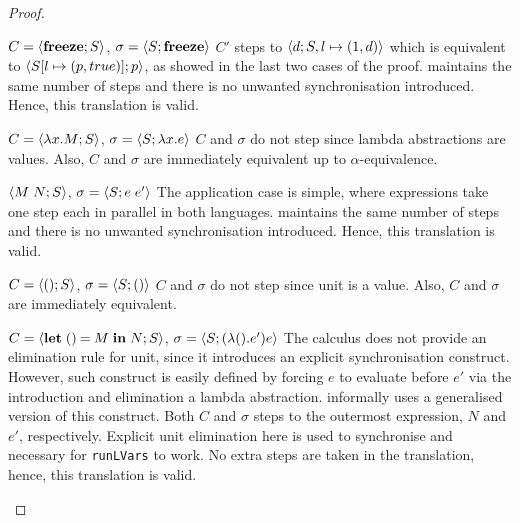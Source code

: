 \documentclass[main.tex]{subfiles}
\begin{document}
\begin{proof}
  \begin{case}{%
      $C = \langle {\ensuremath{\mathbf{freeze}}}; {S} \rangle$,
      $\sigma = \langle {S}; {\mathbf{freeze}} \rangle$}
    $C'$ steps to $\langle {d}; {S, l \mapsto (1, d)} \rangle$ which is equivalent to $\langle {S[l \mapsto (p, true)]}; {p} \rangle$, as showed in the last two cases of the proof. \typedlambdalvar maintains the same number of steps and there is no unwanted synchronisation introduced. Hence, this translation is valid.
  \end{case}

  \begin{case}{%
      $C = \langle {\lambda x.M}; {S} \rangle$,
      $\sigma = \langle {S}; {\lambda x.e} \rangle$}
    $C$ and $\sigma$ do not step since lambda abstractions are values. Also, $C$ and $\sigma$ are immediately equivalent up to $\alpha$-equivalence.
  \end{case}

  \begin{case}{%
      $\langle {M\;N}; {S} \rangle$,
      $ \sigma = \langle {S}; {e\;e'} \rangle$}
    The application case is simple, where expressions take one step each in parallel in both languages. \typedlambdalvar maintains the same number of steps and there is no unwanted synchronisation introduced. Hence, this translation is valid.
  \end{case}

  \begin{case}{%
      $ C = \langle {()}; {S} \rangle$,
      $\sigma = \langle {S}; {()} \rangle$}
    $C$ and $\sigma$ do not step since unit is a value. Also, $C$ and $\sigma$ are immediately equivalent.
  \end{case}

  \begin{case}{%
      $ C = \langle {\ensuremath{\mathbf{let}\;()\mathbin{=}M\;\mathbf{in}\;N}}; {S} \rangle$,
      $\sigma = \langle {S}; {(\lambda (). e')  e} \rangle$}
    The \lambdalvar calculus does not provide an elimination rule for unit, since it introduces an explicit synchronisation construct. However, such construct is easily defined by forcing $e$ to evaluate before $e'$ via the introduction and elimination a lambda abstraction. \citet{kuper15} informally uses a generalised version of this construct. Both $C$ and $\sigma$ steps to the outermost expression, $N$ and $e'$, respectively. Explicit unit elimination here is used to synchronise and necessary for \texttt{runLVars} to work. No extra steps are taken in the translation, hence, this translation is valid.
  \end{case}


\end{proof}
\end{document}

